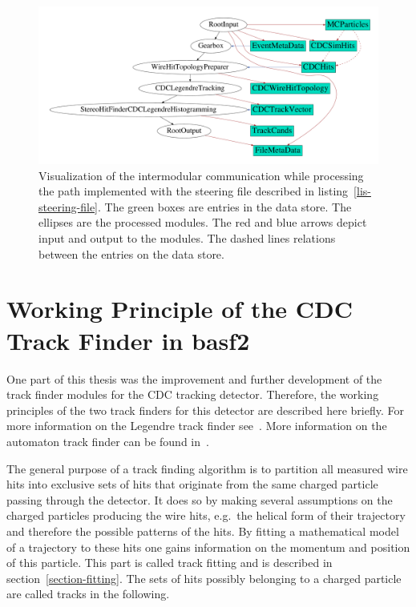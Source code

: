 \begin{figure}
 \centering
 \includegraphics[width=\linewidth]{figures/theory/dataflow.pdf}
 \caption[Visualization of intermodular communication.]{Visualization of the intermodular communication while processing the path implemented with the steering file described in listing~\ref{lis-steering-file}. The green boxes are entries in the data store. The ellipses are the processed modules. The red and blue arrows depict input and output to the modules. The dashed lines relations between the entries on the data store.}
 \label{fig-viz-datastore}
\end{figure}


\section{Working Principle of the CDC Track Finder in basf2}

One part of this thesis was the improvement and further development of the track finder modules for the CDC tracking detector. Therefore, the working principles of the two track finders for this detector are described here briefly. For more information on the Legendre track finder see~\cite{kronenbitter}. More information on the automaton track finder can be found in~\cite{oliver}.

The general purpose of a track finding algorithm is to partition all measured wire hits into exclusive sets of hits that originate from the same charged particle passing through the detector. It does so by making several assumptions on the charged particles producing the wire hits, e.g.\ the helical form of their trajectory and therefore the possible patterns of the hits. By fitting a mathematical model of a trajectory to these hits one gains information on the momentum and position of this particle. This part is called track fitting and is described in section~\ref{section-fitting}. The sets of hits possibly belonging to a charged particle are called tracks in the following.


